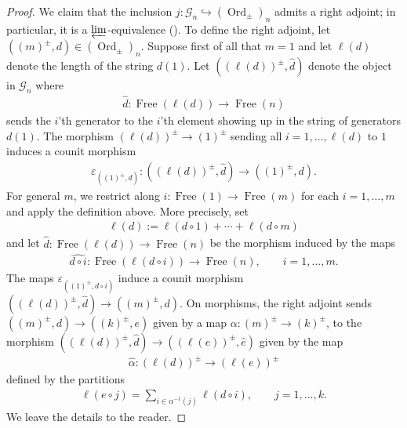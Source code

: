 \documentclass[12pt, reqno]{amsart}
\theoremstyle{plain}
\theoremstyle{definition}
\renewcommand{\epsilon}{\varepsilon}
\begin{document}
\begin{proof}
We claim that the inclusion $j\colon \mathcal{G}_n\hookrightarrow  (\operatorname{Ord}_\pm)_n$ admits a right adjoint; in particular, it is a $\varprojlim$-equivalence (\cite[Theorem 2.19 and Example 2.21]{ClausenOrsnesJansen}). To define the right adjoint, let $((m)^\pm,d)\in (\operatorname{Ord}_\pm)_n$. Suppose first of all that $m=1$ and let $\ell(d)$ denote the length of the string $d(1)$. Let $((\ell(d))^\pm,\hat{d})$ denote the object in $\mathcal{G}_n$ where
\begin{align*}
\hat{d}\colon \operatorname{Free}(\ell(d))\rightarrow \operatorname{Free}(n)
\end{align*}
sends the $i$'th generator to the $i$'th element showing up in the string of generators $d(1)$. The morphism $(\ell(d))^\pm \rightarrow (1)^\pm$ sending all $i=1,\ldots,\ell(d)$ to $1$ induces a counit morphism
\begin{align*}
\epsilon_{((1)^\pm,d)}\colon ((\ell(d))^\pm,\hat{d})\rightarrow ((1)^\pm,d).
\end{align*}
For general $m$, we restrict along $i\colon \operatorname{Free}(1)\rightarrow \operatorname{Free}(m)$ for each $i=1,\ldots,m$ and apply the definition above. More precisely, set
\begin{align*}
\ell(d):=\ell(d\circ 1)+ \cdots +\ell(d\circ m)
\end{align*}
and let $\hat{d}\colon \operatorname{Free}(\ell(d))\rightarrow \operatorname{Free}(n)$ be the morphism induced by the maps
\begin{align*}
\widehat{d\circ i}\colon \operatorname{Free}(\ell(d\circ i))\rightarrow \operatorname{Free}(n),\qquad i=1,\ldots,m.
\end{align*}
The maps $\epsilon_{((1)^\pm,d\circ i)}$ induce a counit morphism $((\ell(d))^\pm,\hat{d})\rightarrow ((m)^\pm,d)$. On morphisms, the right adjoint sends $((m)^\pm,d)\rightarrow ((k)^\pm,e)$ given by a map $\alpha\colon (m)^\pm\rightarrow (k)^\pm$, to the morphism $((\ell(d))^\pm,\hat{d})\rightarrow ((\ell(e))^\pm,\hat{e})$ given by the map
\begin{align*}
\hat{\alpha}\colon (\ell(d))^\pm\rightarrow (\ell(e))^\pm
\end{align*}
defined by the partitions
\begin{align*}
\ell(e\circ j)=\sum_{i\in \alpha^{-1}(j)}\ell(d\circ i),\qquad j=1,\ldots,k.
\end{align*}
We leave the details to the reader.


\end{proof}
\end{document}
